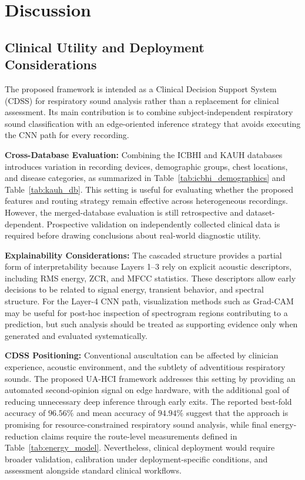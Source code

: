 

\section{Discussion}
\label{sec:discussion}

\subsection{Clinical Utility and Deployment Considerations}
The proposed framework is intended as a Clinical Decision Support System (CDSS) for respiratory sound analysis rather than a replacement for clinical assessment. Its main contribution is to combine subject-independent respiratory sound classification with an edge-oriented inference strategy that avoids executing the CNN path for every recording.

\textbf{Cross-Database Evaluation:}
Combining the ICBHI and KAUH databases introduces variation in recording devices, demographic groups, chest locations, and disease categories, as summarized in Table~\ref{tab:icbhi_demographics} and Table~\ref{tab:kauh_db}. This setting is useful for evaluating whether the proposed features and routing strategy remain effective across heterogeneous recordings. However, the merged-database evaluation is still retrospective and dataset-dependent. Prospective validation on independently collected clinical data is required before drawing conclusions about real-world diagnostic utility.

\textbf{Explainability Considerations:}
The cascaded structure provides a partial form of interpretability because Layers 1--3 rely on explicit acoustic descriptors, including RMS energy, ZCR, and MFCC statistics. These descriptors allow early decisions to be related to signal energy, transient behavior, and spectral structure. For the Layer-4 CNN path, visualization methods such as Grad-CAM may be useful for post-hoc inspection of spectrogram regions contributing to a prediction, but such analysis should be treated as supporting evidence only when generated and evaluated systematically.

\textbf{CDSS Positioning:}
Conventional auscultation can be affected by clinician experience, acoustic environment, and the subtlety of adventitious respiratory sounds. The proposed UA-HCI framework addresses this setting by providing an automated second-opinion signal on edge hardware, with the additional goal of reducing unnecessary deep inference through early exits. The reported best-fold accuracy of $96.56\%$ and mean accuracy of $94.94\%$ suggest that the approach is promising for resource-constrained respiratory sound analysis, while final energy-reduction claims require the route-level measurements defined in Table~\ref{tab:energy_model}. Nevertheless, clinical deployment would require broader validation, calibration under deployment-specific conditions, and assessment alongside standard clinical workflows.
